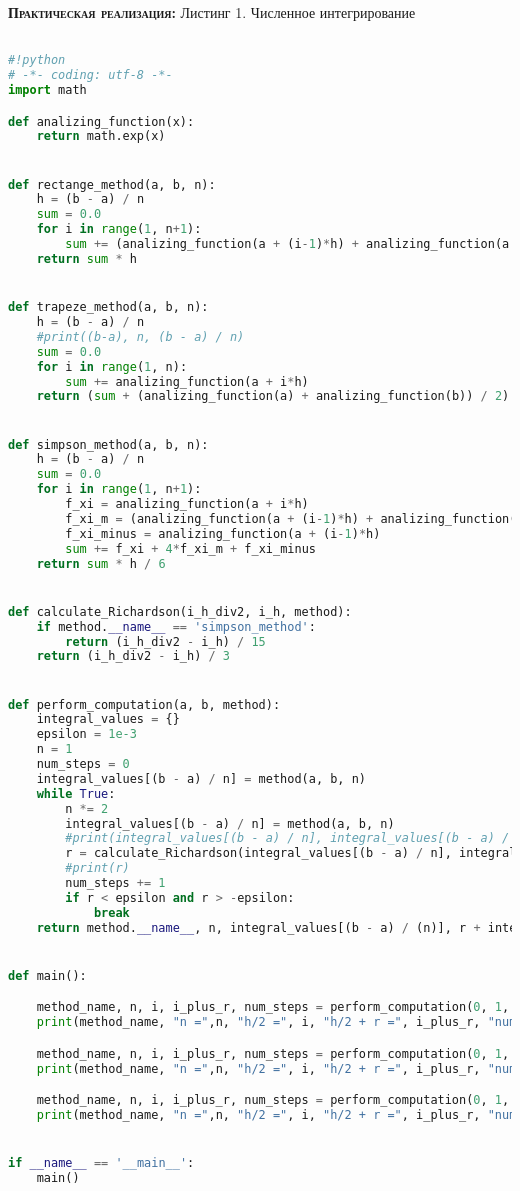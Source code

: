 \documentclass [12pt]{article}
\begin{document}
\textsc{\textbf{Практическая реализация:}}
Листинг 1. Численное интегрирование
\begin{lstlisting}[language=python]

#!python
# -*- coding: utf-8 -*-
import math

def analizing_function(x):
    return math.exp(x)


def rectange_method(a, b, n):
    h = (b - a) / n
    sum = 0.0
    for i in range(1, n+1):
        sum += (analizing_function(a + (i-1)*h) + analizing_function(a + i*h)) / 2
    return sum * h


def trapeze_method(a, b, n):
    h = (b - a) / n
    #print((b-a), n, (b - a) / n)
    sum = 0.0
    for i in range(1, n):
        sum += analizing_function(a + i*h)
    return (sum + (analizing_function(a) + analizing_function(b)) / 2) * h


def simpson_method(a, b, n):
    h = (b - a) / n
    sum = 0.0
    for i in range(1, n+1):
        f_xi = analizing_function(a + i*h)
        f_xi_m = (analizing_function(a + (i-1)*h) + analizing_function(a + i*h)) / 2
        f_xi_minus = analizing_function(a + (i-1)*h)
        sum += f_xi + 4*f_xi_m + f_xi_minus
    return sum * h / 6


def calculate_Richardson(i_h_div2, i_h, method):
    if method.__name__ == 'simpson_method':
        return (i_h_div2 - i_h) / 15
    return (i_h_div2 - i_h) / 3


def perform_computation(a, b, method):
    integral_values = {}
    epsilon = 1e-3
    n = 1
    num_steps = 0
    integral_values[(b - a) / n] = method(a, b, n)
    while True:
        n *= 2
        integral_values[(b - a) / n] = method(a, b, n)
        #print(integral_values[(b - a) / n], integral_values[(b - a) / (n / 2)])
        r = calculate_Richardson(integral_values[(b - a) / n], integral_values[(b - a) / (n / 2)], method)
        #print(r)
        num_steps += 1
        if r < epsilon and r > -epsilon:
            break
    return method.__name__, n, integral_values[(b - a) / (n)], r + integral_values[(b - a) / (n)], num_steps


def main():

    method_name, n, i, i_plus_r, num_steps = perform_computation(0, 1, rectange_method)
    print(method_name, "n =",n, "h/2 =", i, "h/2 + r =", i_plus_r, "number of steps=", num_steps)

    method_name, n, i, i_plus_r, num_steps = perform_computation(0, 1, trapeze_method)
    print(method_name, "n =",n, "h/2 =", i, "h/2 + r =", i_plus_r, "number of steps=", num_steps)

    method_name, n, i, i_plus_r, num_steps = perform_computation(0, 1, simpson_method)
    print(method_name, "n =",n, "h/2 =", i, "h/2 + r =", i_plus_r, "number of steps=", num_steps)


if __name__ == '__main__':
    main()


\end{lstlisting}
\end{document}
